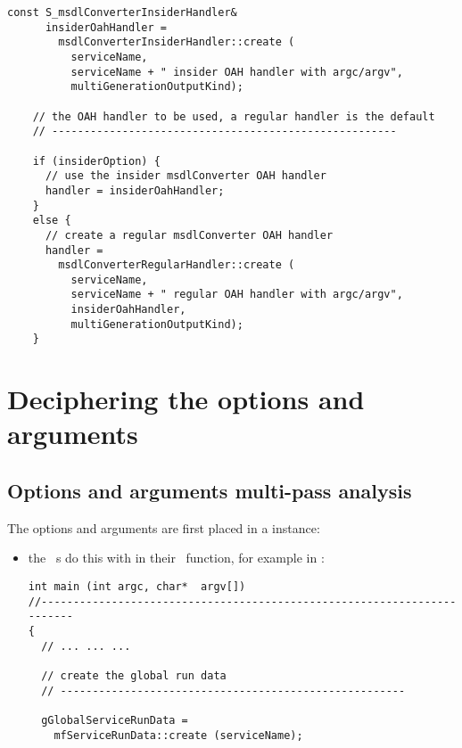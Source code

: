 {\begin{lstlisting}[language=CPlusPlus]
    const S_msdlConverterInsiderHandler&
      insiderOahHandler =
        msdlConverterInsiderHandler::create (
          serviceName,
          serviceName + " insider OAH handler with argc/argv",
          multiGenerationOutputKind);

    // the OAH handler to be used, a regular handler is the default
    // ------------------------------------------------------

    if (insiderOption) {
      // use the insider msdlConverter OAH handler
      handler = insiderOahHandler;
    }
    else {
      // create a regular msdlConverter OAH handler
      handler =
        msdlConverterRegularHandler::create (
          serviceName,
          serviceName + " regular OAH handler with argc/argv",
          insiderOahHandler,
          multiGenerationOutputKind);
    }
\end{lstlisting}


\section{Deciphering the options and arguments}

\subsection{Options and arguments multi-pass analysis}\label{Options and arguments multi-pass analysis}

The options and arguments are first placed in a  instance:
\begin{itemize}
\item the \CLI\ \service s do this with  in their \MainName\ function, for example in : %
\begin{lstlisting}[language=CPlusPlus]
int main (int argc, char*  argv[])
//------------------------------------------------------------------------
{
  // ... ... ...

  // create the global run data
  // ------------------------------------------------------

  gGlobalServiceRunData =
    mfServiceRunData::create (serviceName);


\end{lstlisting}
\end{itemize}}
